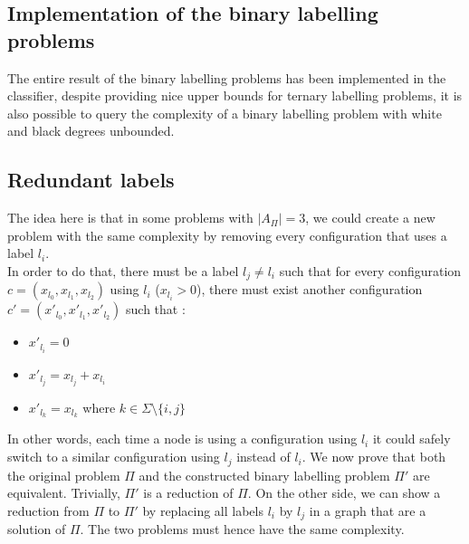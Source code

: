 \subsection{Implementation of the binary labelling problems}
The entire result of the binary labelling problems has been implemented in the classifier, despite providing nice upper bounds for ternary labelling problems, it is also possible to query the complexity of a binary labelling problem with white and black degrees unbounded.
\subsection{Redundant labels}
The idea here is that in some problems with $|A_{\Pi}|=3$, we could create a new problem with the same complexity by removing every configuration that uses a label $l_i$.\\
In order to do that, there must be a label $l_j\neq l_i$ such that for every configuration $c=(x_{l_0},x_{l_1},x_{l_2})$ using $l_i$ ($x_{l_i}>0$), there must exist another configuration $c'=(x'_{l_0},x'_{l_1},x'_{l_2})$ such that : 
\begin{itemize}
    \item $x'_{l_i}=0$
    \item $x'_{l_j}= x_{l_j}+x_{l_i}$
    \item $x'_{l_k} = x_{l_k}$ where $ k \in \Sigma \setminus \{i,j\}$ 
\end{itemize}
In other words, each time a node is using a configuration using $l_i$ it could safely switch to a similar configuration using $l_j$ instead of $l_i$.
We now prove that both the original problem $\Pi$ and the constructed binary labelling problem $\Pi'$ are equivalent.
Trivially, $\Pi'$ is a reduction of $\Pi$. On the other side, we can show a reduction from $\Pi$ to $\Pi'$ by replacing all labels $l_i$ by $l_j$ in a graph that are a solution of $\Pi$. The two problems must hence have the same complexity.

